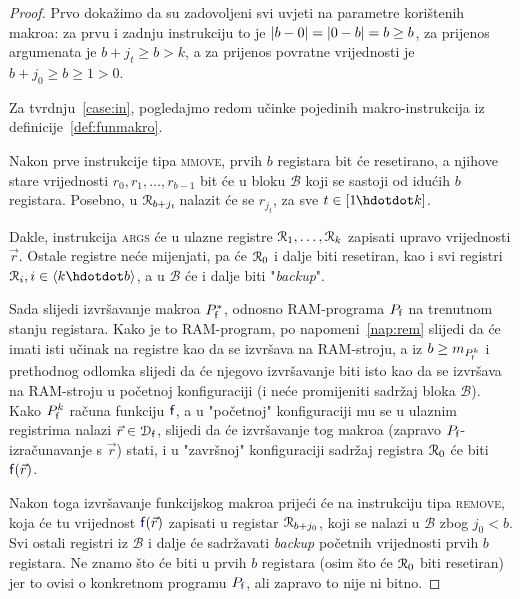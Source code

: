\begin{proof}
Prvo dokažimo da su zadovoljeni svi uvjeti na parametre korištenih makroa: za prvu i zadnju instrukciju to je $\lvert b-0\rvert=\lvert0-b\rvert=b\ge b$, za prijenos argumenata je $b+j_t\ge b>k$, a za prijenos povratne vrijednosti je $b+j_0\ge b\ge 1>0$.

Za tvrdnju~\ref{case:in}, pogledajmo redom učinke pojedinih makro-instrukcija iz definicije~\ref{def:funmakro}.

	Nakon prve instrukcije tipa \textsc{mmove}, prvih $b$ registara bit će resetirano, a njihove stare vrijednosti $r_0,r_1,\dots,r_{b-1}$ bit će u bloku $\mathcal B$ koji se sastoji od idućih $b$ registara. Posebno, u $\mathcal R_{b+j_t}\!$ nalazit će se $r_{j_t}$, za sve $t\in[1\mspace{-1mu}\dd k]$.

Dakle, instrukcija \textsc{args} će u ulazne registre $\mathcal R_{1},\dots,\mathcal R_{k}$ zapisati upravo vrijednosti $\vec r$. Ostale registre neće mijenjati, pa će $\mathcal R_{0}$ i dalje biti resetiran, kao i svi registri $\reg{i},i\in\langle k\dd b\rangle$, a u $\mathcal B$ će i dalje biti "\!\emph{backup}".

	Sada slijedi izvršavanje makroa $P_{\f{f}}^*$, odnosno RAM-programa $P_{\f{f}}$ na trenutnom stanju registara. Kako je to RAM-program, po napomeni~\ref{nap:rem} slijedi da će imati isti učinak na registre kao da se izvršava na RAM-stroju, a iz $b\ge m_{P_{\f{f}}^k}$ i prethodnog odlomka slijedi da će njegovo izvršavanje biti isto kao da se izvršava na RAM-stroju u početnoj konfiguraciji (i neće promijeniti sadržaj bloka $\mathcal B$). Kako $P_{\f{f}}^k$ računa funkciju $\f{f}$, a u "početnoj" konfiguraciji mu se u ulaznim registrima nalazi $\vec r\in\dom{\f{f}}$, slijedi da će izvršavanje tog makroa  (zapravo $P_{\f{f}}$-izračunavanje s $\vec r$) stati, i u "završnoj" konfiguraciji sadržaj registra $\mathcal R_{0}$ će biti $\f{f}(\vec r)$.

	Nakon toga izvršavanje funkcijskog makroa prijeći će na instrukciju tipa \textsc{remove}, koja će tu vrijednost $\f{f}(\vec r)$ zapisati u registar $\mathcal R_{b+j_0}$, koji se nalazi u $\mathcal B$ zbog $j_0<b$. Svi ostali registri iz $\mathcal B$ i dalje će sadržavati \emph{backup} početnih vrijednosti prvih $b$ registara. Ne znamo što će biti u prvih $b$ registara (osim što će $\mathcal R_{0}$ biti resetiran) jer to ovisi o konkretnom programu $P_{\f f}$, ali zapravo to nije ni bitno.


\end{proof}
